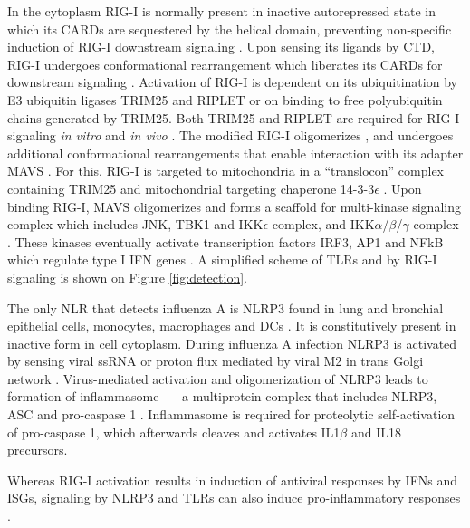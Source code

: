 		In the cytoplasm \gls{RIG-I} is normally present in inactive autorepressed state in which its \glspl{CARD} are sequestered by the helical domain, preventing non-specific induction of \gls{RIG-I} downstream signaling \parencite{Kowalinski2011}. Upon sensing its ligands by \gls{CTD}, \gls{RIG-I} undergoes conformational rearrangement which liberates its \glspl{CARD} for downstream signaling \parencite{Kowalinski2011}. Activation of \gls{RIG-I} is  dependent on its ubiquitination by E3 ubiquitin ligases TRIM25 and RIPLET or on binding to free polyubiquitin chains generated by TRIM25. Both TRIM25 and RIPLET are required for \gls{RIG-I} signaling \textit{in vitro} and \textit{in vivo} \parencite{Gack2007, Oshiumi2010, Zeng2010}. The modified \gls{RIG-I} oligomerizes \parencite{Patel2013}, and undergoes additional conformational rearrangements that enable interaction with its adapter \gls{MAVS} \parencite{Kawai2005, Seth2005}. For this, \gls{RIG-I} is targeted to mitochondria in a ``translocon'' complex containing TRIM25 and mitochondrial targeting chaperone 14-3-3$\epsilon$ \parencite{Liu2012}. Upon binding \gls{RIG-I}, \gls{MAVS} oligomerizes and forms a scaffold for multi-kinase signaling complex which includes \gls{JNK}, \gls{TBK1} and \gls{IKK}$\epsilon$ complex, and \gls{IKK}$\alpha$/$\beta$/$\gamma$ complex \parencite{McWhirter2005}. These kinases eventually activate transcription factors \gls{IRF}3, \gls{AP1} and \gls{NFkB} which regulate type I \gls{IFN} genes \parencite{McWhirter2005}. A simplified scheme of \glspl{TLR} and by \gls{RIG-I} signaling is shown on Figure \ref{fig:detection}.
		
		The only \gls{NLR} that detects influenza A is \gls{NLRP3} found in lung and bronchial epithelial cells, monocytes, macrophages and \gls{DC}s \parencite{Guarda2011, Kim2014}. It is constitutively present in inactive form in cell cytoplasm. During influenza A infection \gls{NLRP3} is activated by sensing viral \gls{ssRNA} or proton flux mediated by viral \gls{M2} in trans Golgi network \parencite{Thomas2009, Ichinohe2010, Allen2009}. Virus-mediated activation and oligomerization of \gls{NLRP3} leads to formation of inflammasome~--- a multiprotein complex that includes \gls{NLRP3}, \gls{ASC} and pro-caspase 1 \parencite{Tschopp2010}. Inflammasome is required for proteolytic self-activation of pro-caspase 1, which afterwards cleaves and activates IL1$\beta$ and IL18 precursors.
	
		Whereas \gls{RIG-I} activation results in induction of antiviral responses by \gls{IFN}s and \gls{ISG}s, signaling by \gls{NLRP3} and \glspl{TLR} can also induce pro-inflammatory responses \parencite{LeGoffic2007, Allen2009, Kawai2007}. 
		
